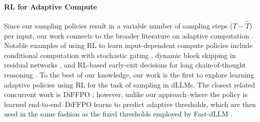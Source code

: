 \paragraph{RL for Adaptive Compute} Since our sampling policies result in a variable number of sampling steps ($T - \hat{T}$) per input, our work connects to the broader literature on adaptive computation \citep{graves2016adaptive, teerapittayanon2016branchynet}. Notable examples of using RL to learn input-dependent compute policies include conditional computation with stochastic gating \citep{bengio2015conditional}, dynamic block skipping in residual networks \citep{wang2018skipnet}, and RL-based early-exit decisions for long chain-of-thought reasoning \citep{dai2025s}. To the best of our knowledge, our work is the first to explore learning adaptive policies using RL for the task of sampling in dLLMs. The closest related concurrent work is DiFFPO \citep{zhao2025diffpo}; however, unlike our approach--where the policy is learned end-to-end--DiFFPO learns to predict adaptive thresholds, which are then used in the same fashion as the fixed thresholds employed by Fast-dLLM \citep{fastdllm2025}.


